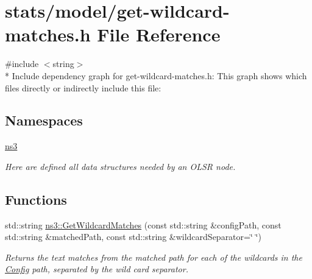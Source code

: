 \hypertarget{get-wildcard-matches_8h}{}\section{stats/model/get-\/wildcard-\/matches.h File Reference}
\label{get-wildcard-matches_8h}
{\ttfamily \#include $<$string$>$}\\*
Include dependency graph for get-\/wildcard-\/matches.h\+:
This graph shows which files directly or indirectly include this file\+:
\subsection*{Namespaces}
\begin{DoxyCompactItemize}
\item 
 \hyperlink{namespacens3}{ns3}
\begin{DoxyCompactList}\small\item\em Here are defined all data structures needed by an O\+L\+SR node. \end{DoxyCompactList}\end{DoxyCompactItemize}
\subsection*{Functions}
\begin{DoxyCompactItemize}
\item 
std\+::string \hyperlink{namespacens3_ab2d3424cd46a0cf26722b70079835354}{ns3\+::\+Get\+Wildcard\+Matches} (const std\+::string \&config\+Path, const std\+::string \&matched\+Path, const std\+::string \&wildcard\+Separator=\char`\"{} \char`\"{})
\begin{DoxyCompactList}\small\item\em Returns the text matches from the matched path for each of the wildcards in the \hyperlink{namespacens3_1_1Config}{Config} path, separated by the wild card separator. \end{DoxyCompactList}\end{DoxyCompactItemize}
